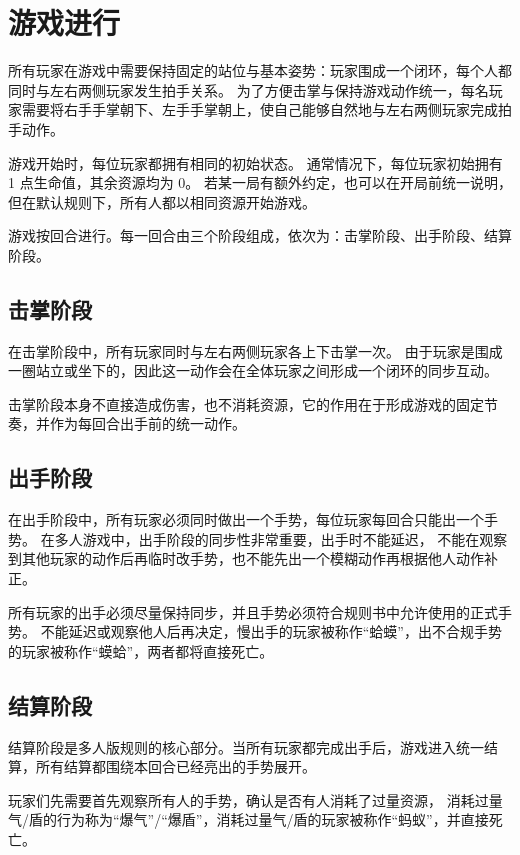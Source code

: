 \documentclass[12pt]{ctexart}
\begin{document}
\section{游戏进行}


所有玩家在游戏中需要保持固定的站位与基本姿势：玩家围成一个闭环，每个人都同时与左右两侧玩家发生拍手关系。
为了方便击掌与保持游戏动作统一，每名玩家需要将右手手掌朝下、左手手掌朝上，使自己能够自然地与左右两侧玩家完成拍手动作。

游戏开始时，每位玩家都拥有相同的初始状态。
通常情况下，每位玩家初始拥有 1 点生命值，其余资源均为 0。
若某一局有额外约定，也可以在开局前统一说明，但在默认规则下，所有人都以相同资源开始游戏。

游戏按回合进行。每一回合由三个阶段组成，依次为：击掌阶段、出手阶段、结算阶段。

\subsection{击掌阶段}

在击掌阶段中，所有玩家同时与左右两侧玩家各上下击掌一次。
由于玩家是围成一圈站立或坐下的，因此这一动作会在全体玩家之间形成一个闭环的同步互动。

击掌阶段本身不直接造成伤害，也不消耗资源，它的作用在于形成游戏的固定节奏，并作为每回合出手前的统一动作。

\subsection{出手阶段}

在出手阶段中，所有玩家必须同时做出一个手势，每位玩家每回合只能出一个手势。
在多人游戏中，出手阶段的同步性非常重要，出手时不能延迟，
不能在观察到其他玩家的动作后再临时改手势，也不能先出一个模糊动作再根据他人动作补正。

所有玩家的出手必须尽量保持同步，并且手势必须符合规则书中允许使用的正式手势。
不能延迟或观察他人后再决定，慢出手的玩家被称作“蛤蟆”，出不合规手势的玩家被称作“蟆蛤”，两者都将直接死亡。

\subsection{结算阶段}

结算阶段是多人版规则的核心部分。当所有玩家都完成出手后，游戏进入统一结算，所有结算都围绕本回合已经亮出的手势展开。

玩家们先需要首先观察所有人的手势，确认是否有人消耗了过量资源，
消耗过量气/盾的行为称为“爆气”/“爆盾”，消耗过量气/盾的玩家被称作“蚂蚁”，并直接死亡。
\end{document}
